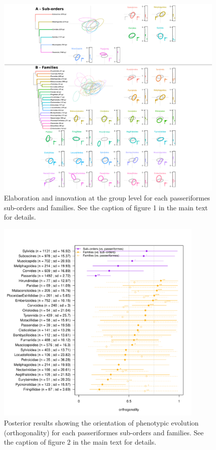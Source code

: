 \documentclass[sn-mathphys]{sn-jnl}%
\theoremstyle{thmstyleone}%
\theoremstyle{thmstyletwo}%
\theoremstyle{thmstylethree}%
\begin{document}
\begin{figure}[!htbp]
\centering
   \includegraphics[width=1\textwidth]{Figures/ellipses_passeriformes.pdf}
\caption{Elaboration and innovation at the group level for each passeriformes sub-orders and families. See the caption of figure 1 in the main text for details.}
\label{fig_ellipses_passeriformes}
\end{figure}

\begin{figure}[!htbp]
\centering
   \includegraphics[width=0.9\textwidth]{Figures/orthogonality_results_passeriformes.pdf}
\caption{Posterior results showing the orientation of phenotypic evolution (orthogonality) for each passeriformes sub-orders and families. See the caption of figure 2 in the main text for details.}
\label{fig_orthogonality_passeriformes}
\end{figure}
\end{document}
